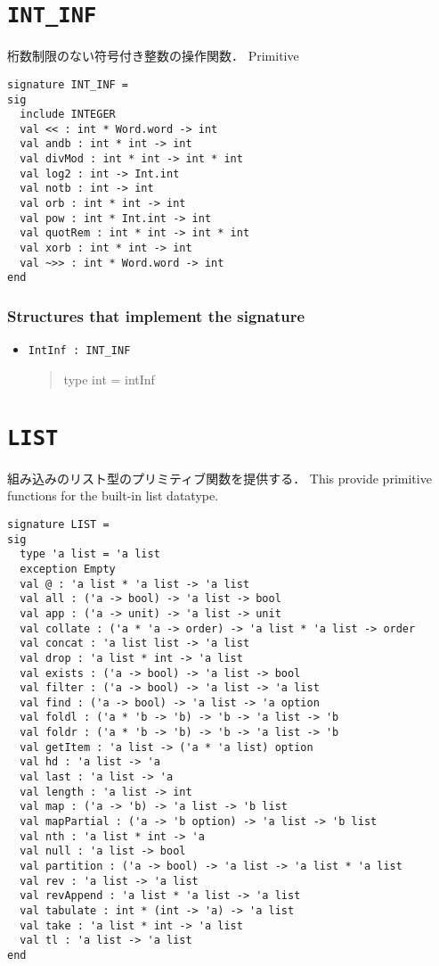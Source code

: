 \documentclass{jbook}
\newcommand{\txt}[2]{#2}
\newcommand{\code}[1]{\mbox{\large\tt #1}}
\newenvironment{program}{\begin{quote}\begin{tt}}%
                        {\end{tt}\end{quote}}
\newcommand{\signature}[2]{
\section{{\tt #1}}\label{section:reference:#2}
}
\newcommand{\Structure}{\subsubsection*{\txt{シグネチャを実装するストラクチャ}{Structures that implement the signature}}}
\begin{document}
\signature{INT\_INF}{INTINF}
\ifjp%
	桁数制限のない符号付き整数の操作関数．
\else%
	Primitive 
\fi%

\begin{verbatim}
signature INT_INF =
sig
  include INTEGER
  val << : int * Word.word -> int
  val andb : int * int -> int
  val divMod : int * int -> int * int
  val log2 : int -> Int.int
  val notb : int -> int
  val orb : int * int -> int
  val pow : int * Int.int -> int
  val quotRem : int * int -> int * int
  val xorb : int * int -> int
  val ~>> : int * Word.word -> int
end
\end{verbatim}

\Structure
\begin{itemize}
\item \code{IntInf : INT\_INF}
\begin{program}
   type int = intInf
\end{program}
\end{itemize}

\signature{LIST}{LIST}
\ifjp%
	組み込みのリスト型のプリミティブ関数を提供する．
\else%
	This provide primitive functions for the built-in list datatype.
\fi%

\begin{verbatim}
signature LIST =
sig
  type 'a list = 'a list
  exception Empty
  val @ : 'a list * 'a list -> 'a list
  val all : ('a -> bool) -> 'a list -> bool
  val app : ('a -> unit) -> 'a list -> unit
  val collate : ('a * 'a -> order) -> 'a list * 'a list -> order
  val concat : 'a list list -> 'a list
  val drop : 'a list * int -> 'a list
  val exists : ('a -> bool) -> 'a list -> bool
  val filter : ('a -> bool) -> 'a list -> 'a list
  val find : ('a -> bool) -> 'a list -> 'a option
  val foldl : ('a * 'b -> 'b) -> 'b -> 'a list -> 'b
  val foldr : ('a * 'b -> 'b) -> 'b -> 'a list -> 'b
  val getItem : 'a list -> ('a * 'a list) option
  val hd : 'a list -> 'a
  val last : 'a list -> 'a
  val length : 'a list -> int
  val map : ('a -> 'b) -> 'a list -> 'b list
  val mapPartial : ('a -> 'b option) -> 'a list -> 'b list
  val nth : 'a list * int -> 'a
  val null : 'a list -> bool
  val partition : ('a -> bool) -> 'a list -> 'a list * 'a list
  val rev : 'a list -> 'a list
  val revAppend : 'a list * 'a list -> 'a list
  val tabulate : int * (int -> 'a) -> 'a list
  val take : 'a list * int -> 'a list
  val tl : 'a list -> 'a list
end
\end{verbatim}
\end{document}
